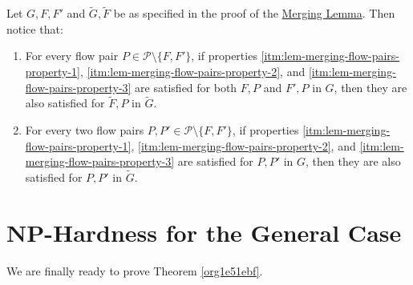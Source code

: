 \documentclass[fontsize=11pt,paper=a4]{book}
\begin{document}
\begin{remark}
Let \(G,F,F'\) and \(\tilde{G},\tilde{F}\) be as specified in the proof of the \hyperref[org7dbdd46]{Merging Lemma}.
Then notice that:

\begin{enumerate}
\item \label{itm:remark-merging-flow-pairs-1}
For every flow pair \(P\in\mathcal{P}\setminus\{F,F'\}\), if properties \ref{itm:lem-merging-flow-pairs-property-1}, \ref{itm:lem-merging-flow-pairs-property-2}, and \ref{itm:lem-merging-flow-pairs-property-3} are satisfied for both \(F,P\) and \(F',P\) in \(G\), then they are also satisfied for \(\tilde{F},P\) in \(\tilde{G}\).

\item \label{itm:remark-merging-flow-pairs-2}
For every two flow pairs \(P,P'\in\mathcal{P}\setminus\{F,F'\}\), if properties \ref{itm:lem-merging-flow-pairs-property-1}, \ref{itm:lem-merging-flow-pairs-property-2}, and \ref{itm:lem-merging-flow-pairs-property-3} are satisfied for \(P,P'\) in \(G\), then they are also satisfied for \(P,P'\) in \(\tilde{G}\).
\end{enumerate}
\label{orga6e2e8a}
\end{remark}

\chapter{\(\textbf{NP}\)-Hardness for the General Case}
\label{sec:org294c743}

We are finally ready to prove Theorem \ref{org1e51ebf}.
\end{document}
